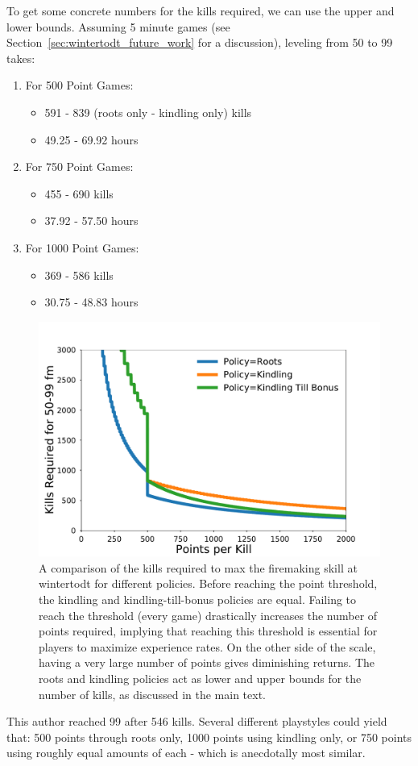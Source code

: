 		To get some concrete numbers for the kills required, we can use the upper and lower bounds. Assuming 5 minute games (see Section~\ref{sec:wintertodt_future_work} for a discussion), leveling from 50 to 99 takes: 
		\begin{enumerate}
			\item For 500 Point Games:
			\begin{itemize}
		        \item 591 - 839 (roots only - kindling only) kills
		        \item 49.25 - 69.92 hours
	    	\end{itemize}
	    	\item For 750 Point Games:
	        \begin{itemize}
		        \item 455 - 690 kills
		        \item 37.92 - 57.50 hours
	    	\end{itemize}
	    	\item For 1000 Point Games:
	        \begin{itemize}
		        \item 369 - 586 kills
		        \item 30.75 - 48.83 hours
	    	\end{itemize}
	    \end{enumerate}
		\begin{figure}
			\centering
			\includegraphics[width=\linewidth]{results/firemaking/policies.pdf}
			\caption{
				A comparison of the kills required to max the firemaking skill at wintertodt for different policies. Before reaching the point threshold, the kindling and kindling-till-bonus policies are equal. Failing to reach the threshold (every game) drastically increases the number of points required, implying that reaching this threshold is essential for players to maximize experience rates. On the other side of the scale, having a very large number of points gives diminishing returns. The roots and kindling policies act as lower and upper bounds for the number of kills, as discussed in the main text.
			}
			\label{fig:wintertodt_policies}
		\end{figure}
		This author reached 99 after 546 kills. Several different playstyles could yield that: 500 points through roots only, 1000 points using kindling only, or 750 points using roughly equal amounts of each - which is anecdotally most similar.

